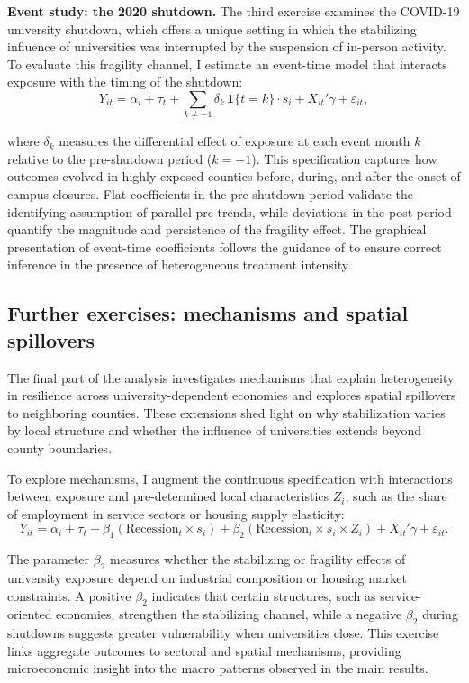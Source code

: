 \noindent \textbf{Event study: the 2020 shutdown.} The third exercise examines the COVID-19 university shutdown, which offers a unique setting in which the stabilizing influence of universities was interrupted by the suspension of in-person activity. To evaluate this fragility channel, I estimate an event-time model that interacts exposure with the timing of the shutdown:
\begin{equation}
	\label{eq:event}
	Y_{it} = \alpha_i + \tau_t + \sum_{k\neq -1}\delta_k\,\mathbf{1}\{t=k\}\cdot s_i + X_{it}'\gamma + \varepsilon_{it},
\end{equation}

where $\delta_k$ measures the differential effect of exposure at each event month $k$ relative to the pre-shutdown period ($k=-1$). This specification captures how outcomes evolved in highly exposed counties before, during, and after the onset of campus closures. Flat coefficients in the pre-shutdown period validate the identifying assumption of parallel pre-trends, while deviations in the post period quantify the magnitude and persistence of the fragility effect. The graphical presentation of event-time coefficients follows the guidance of \citet{SunAbraham2021EventStudy} to ensure correct inference in the presence of heterogeneous treatment intensity.

\subsection{ Further exercises: mechanisms and spatial spillovers}

\noindent The final part of the analysis investigates mechanisms that explain heterogeneity in resilience across university-dependent economies and explores spatial spillovers to neighboring counties. These extensions shed light on why stabilization varies by local structure and whether the influence of universities extends beyond county boundaries.

To explore mechanisms, I augment the continuous specification with interactions between exposure and pre-determined local characteristics $Z_i$, such as the share of employment in service sectors or housing supply elasticity:
\begin{equation}
	\label{eq:mech}
	Y_{it} = \alpha_i + \tau_t + \beta_1(\text{Recession}_t \times s_i) + \beta_2(\text{Recession}_t \times s_i \times Z_i) + X_{it}'\gamma + \varepsilon_{it}.
\end{equation}

The parameter $\beta_2$ measures whether the stabilizing or fragility effects of university exposure depend on industrial composition or housing market constraints. A positive $\beta_2$ indicates that certain structures, such as service-oriented economies, strengthen the stabilizing channel, while a negative $\beta_2$ during shutdowns suggests greater vulnerability when universities close. This exercise links aggregate outcomes to sectoral and spatial mechanisms, providing microeconomic insight into the macro patterns observed in the main results.

